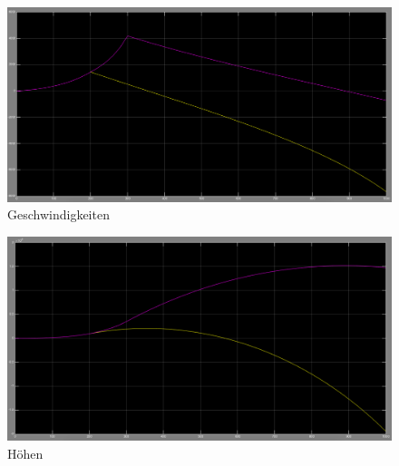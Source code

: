 \documentclass[10pt,a4paper]{article}
\begin{document}
		 		\begin{figure}[H]
	 	 	 	 		\centering
	 	 	 	 		\includegraphics[width=1\textwidth]{../aufgabe1/screens/geschwindigkeiten.png}
	 	 	 	 		\caption{Geschwindigkeiten}
	 	 	 	 	\end{figure}
		 		\begin{figure}[H]
		 	 	 	 		\centering
		 	 	 	 		\includegraphics[width=1\textwidth]{../aufgabe1/screens/hoehen.png}
		 	 	 	 		\caption{Höhen}
		 	 	 	 	\end{figure}
\end{document}

